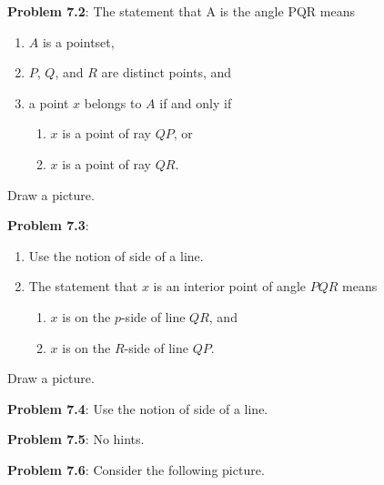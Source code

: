 \documentclass[english]{book}
\begin{document}
\vspace{0.3cm}

\textbf{Problem 7.2}: The statement that A is the angle PQR means
\begin{enumerate}[\hspace{1cm}1)]
  \item $A$ is a pointset,
  \item $P$, $Q$, and $R$ are distinct points, and
  \item a point $x$ belongs to $A$ if and only if
  \begin{enumerate}[\hspace{1cm}a)]
    \item $x$ is a point of ray $QP$, or
    \item $x$ is a point of ray $QR$.
  \end{enumerate}
\end{enumerate}
\hspace{1cm} Draw a picture.

\vspace{0.3cm}

\textbf{Problem 7.3}:
\begin{enumerate}[\hspace{1cm}1)]
  \item Use the notion of side of a line.
  \item The statement that $x$ is an interior point of angle $PQR$ means
  \begin{enumerate}[\hspace{1cm}a)]
    \item $x$ is on the $p$-side of line $QR$, and
    \item $x$ is on the $R$-side of line $QP$.
  \end{enumerate}
\end{enumerate}
\hspace{1cm} Draw a picture.

\vspace{0.3cm}

\textbf{Problem 7.4}: Use the notion of side of a line.

\vspace{0.3cm}

\textbf{Problem 7.5}: No hints.

\vspace{0.3cm}

\textbf{Problem 7.6}: Consider the following picture.
\end{document}
